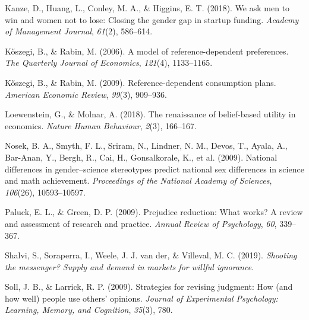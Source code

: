 \documentclass[
  man,
  floatsintext,
  longtable,
  nolmodern,
  notxfonts,
  notimes,
  colorlinks=true,linkcolor=blue,citecolor=blue,urlcolor=blue]{apa7}
\newlength{\cslhangindent}
\newenvironment{CSLReferences}[2] %
 {\begin{list}{}{%
  \setlength{\itemindent}{0pt}
  \setlength{\leftmargin}{0pt}
  \setlength{\parsep}{0pt}
  \ifodd #1
   \setlength{\leftmargin}{\cslhangindent}
   \setlength{\itemindent}{-1\cslhangindent}
  \fi
  \setlength{\itemsep}{#2\baselineskip}}}
 {\end{list}}
\begin{document}
\begin{CSLReferences}{1}{0}
Kanze, D., Huang, L., Conley, M. A., \& Higgins, E. T. (2018). We ask
men to win and women not to lose: {Closing} the gender gap in startup
funding. \emph{Academy of Management Journal}, \emph{61}(2), 586--614.

Kőszegi, B., \& Rabin, M. (2006). A model of reference-dependent
preferences. \emph{The Quarterly Journal of Economics}, \emph{121}(4),
1133--1165.

Kőszegi, B., \& Rabin, M. (2009). Reference-dependent consumption plans.
\emph{American Economic Review}, \emph{99}(3), 909--936.

Loewenstein, G., \& Molnar, A. (2018). The renaissance of belief-based
utility in economics. \emph{Nature Human Behaviour}, \emph{2}(3),
166--167.

Nosek, B. A., Smyth, F. L., Sriram, N., Lindner, N. M., Devos, T.,
Ayala, A., Bar-Anan, Y., Bergh, R., Cai, H., Gonsalkorale, K., et al.
(2009). National differences in gender--science stereotypes predict
national sex differences in science and math achievement.
\emph{Proceedings of the National Academy of Sciences}, \emph{106}(26),
10593--10597.

Paluck, E. L., \& Green, D. P. (2009). Prejudice reduction: What works?
A review and assessment of research and practice. \emph{Annual Review of
Psychology}, \emph{60}, 339--367.

Shalvi, S., Soraperra, I., Weele, J. J. van der, \& Villeval, M. C.
(2019). \emph{Shooting the messenger? Supply and demand in markets for
willful ignorance}.

Soll, J. B., \& Larrick, R. P. (2009). Strategies for revising judgment:
How (and how well) people use others' opinions. \emph{Journal of
Experimental Psychology: Learning, Memory, and Cognition}, \emph{35}(3),
780.

\end{CSLReferences}
\end{document}
